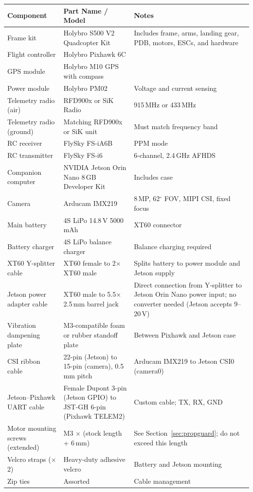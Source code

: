 \documentclass{article}
\begin{document}
\begin{longtable}{p{4.5cm}p{4.5cm}p{4cm}}
\toprule
\textbf{Component} & \textbf{Part Name / Model} & \textbf{Notes} \\
\midrule
\endhead
Frame kit & Holybro S500 V2 Quadcopter Kit & Includes frame, arms, landing gear, PDB, motors, ESCs, and hardware \\
Flight controller & Holybro Pixhawk 6C & \\
GPS module & Holybro M10 GPS with compass & \\
Power module & Holybro PM02 & Voltage and current sensing \\
Telemetry radio (air) & RFD900x or SiK Radio & 915\,MHz or 433\,MHz \\
Telemetry radio (ground) & Matching RFD900x or SiK unit & Must match frequency band \\
RC receiver & FlySky FS-iA6B & PPM mode \\
RC transmitter & FlySky FS-i6 & 6-channel, 2.4\,GHz AFHDS \\
Companion computer & NVIDIA Jetson Orin Nano 8\,GB Developer Kit & Includes case \\
Camera & Arducam IMX219 & 8\,MP, 62$^\circ$ FOV, MIPI CSI, fixed focus \\
Main battery & 4S LiPo 14.8\,V 5000\,mAh & XT60 connector \\
Battery charger & 4S LiPo balance charger & Balance charging required \\
XT60 Y-splitter cable & XT60 female to 2$\times$ XT60 male & Splits battery to power module and Jetson supply \\
Jetson power adapter cable & XT60 male to 5.5$\times$2.5\,mm barrel jack & Direct connection from Y-splitter to Jetson Orin Nano power input; no converter needed (Jetson accepts 9--20\,V) \\
Vibration dampening plate & M3-compatible foam or rubber standoff plate & Between Pixhawk and Jetson case \\
CSI ribbon cable & 22-pin (Jetson) to 15-pin (camera), 0.5\,mm pitch & Arducam IMX219 to Jetson CSI0 (camera0) \\
Jetson--Pixhawk UART cable & Female Dupont 3-pin (Jetson GPIO) to JST-GH 6-pin (Pixhawk TELEM2) & Custom cable; TX, RX, GND \\
Motor mounting screws (extended) & M3 $\times$ (stock length + 6\,mm) & See Section~\ref{sec:propguard}; do not exceed this length \\
Velcro straps ($\times$2) & Heavy-duty adhesive velcro & Battery and Jetson mounting \\
Zip ties & Assorted & Cable management \\
\bottomrule
\end{longtable}
\end{document}
